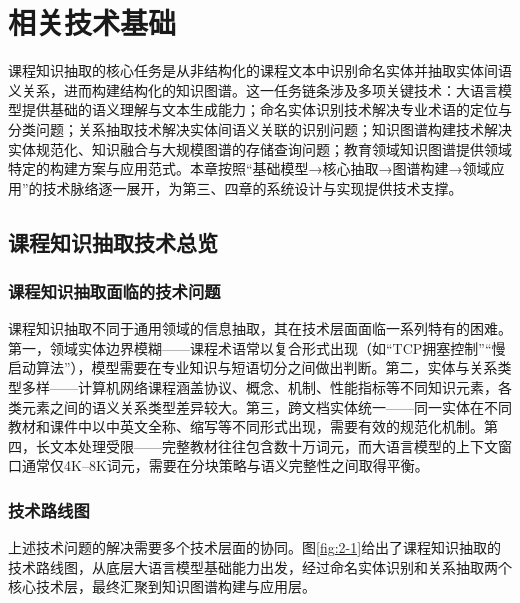 \section{相关技术基础}

课程知识抽取的核心任务是从非结构化的课程文本中识别命名实体并抽取实体间语义关系，进而构建结构化的知识图谱。这一任务链条涉及多项关键技术：大语言模型提供基础的语义理解与文本生成能力；命名实体识别技术解决专业术语的定位与分类问题；关系抽取技术解决实体间语义关联的识别问题；知识图谱构建技术解决实体规范化、知识融合与大规模图谱的存储查询问题；教育领域知识图谱提供领域特定的构建方案与应用范式。本章按照“基础模型→核心抽取→图谱构建→领域应用”的技术脉络逐一展开，为第三、四章的系统设计与实现提供技术支撑。

\subsection{课程知识抽取技术总览}

\subsubsection{课程知识抽取面临的技术问题}

课程知识抽取不同于通用领域的信息抽取，其在技术层面面临一系列特有的困难。第一，领域实体边界模糊——课程术语常以复合形式出现（如“TCP拥塞控制”“慢启动算法”），模型需要在专业知识与短语切分之间做出判断。第二，实体与关系类型多样——计算机网络课程涵盖协议、概念、机制、性能指标等不同知识元素，各类元素之间的语义关系类型差异较大。第三，跨文档实体统一——同一实体在不同教材和课件中以中英文全称、缩写等不同形式出现，需要有效的规范化机制。第四，长文本处理受限——完整教材往往包含数十万词元，而大语言模型的上下文窗口通常仅4K--8K词元，需要在分块策略与语义完整性之间取得平衡。

\subsubsection{技术路线图}

上述技术问题的解决需要多个技术层面的协同。图\ref{fig:2-1}给出了课程知识抽取的技术路线图，从底层大语言模型基础能力出发，经过命名实体识别和关系抽取两个核心技术层，最终汇聚到知识图谱构建与应用层。

